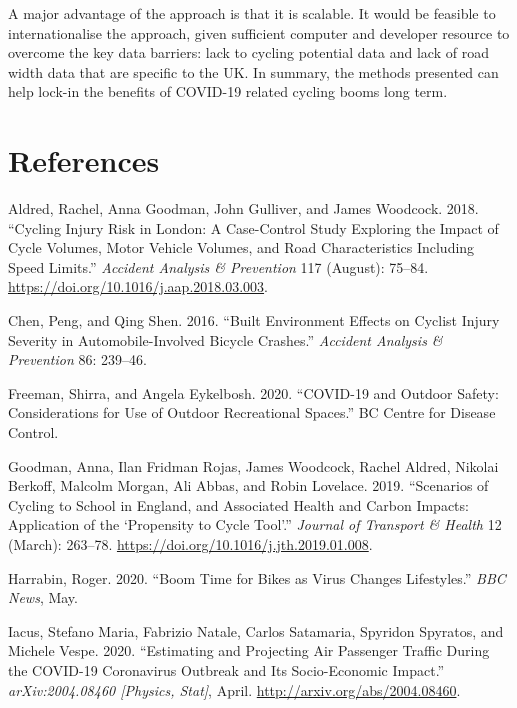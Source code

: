 \documentclass[
]{article}
\newlength{\cslhangindent}
\newenvironment{cslreferences}%
  {\setlength{\parindent}{0pt}%
  \everypar{\setlength{\hangindent}{\cslhangindent}}\ignorespaces}%
  {\par}
\begin{document}
A major advantage of the approach is that it is scalable.
It would be feasible to internationalise the approach, given sufficient computer and developer resource to overcome the key data barriers: lack to cycling potential data and lack of road width data that are specific to the UK.
In summary, the methods presented can help lock-in the benefits of COVID-19 related cycling booms long term.

\hypertarget{references}{%
\section*{References}\label{references}}

\hypertarget{refs}{}
\begin{cslreferences}
\leavevmode\hypertarget{ref-aldred_cycling_2018}{}%
Aldred, Rachel, Anna Goodman, John Gulliver, and James Woodcock. 2018. ``Cycling Injury Risk in London: A Case-Control Study Exploring the Impact of Cycle Volumes, Motor Vehicle Volumes, and Road Characteristics Including Speed Limits.'' \emph{Accident Analysis \& Prevention} 117 (August): 75--84. \url{https://doi.org/10.1016/j.aap.2018.03.003}.

\leavevmode\hypertarget{ref-chen_built_2016}{}%
Chen, Peng, and Qing Shen. 2016. ``Built Environment Effects on Cyclist Injury Severity in Automobile-Involved Bicycle Crashes.'' \emph{Accident Analysis \& Prevention} 86: 239--46.

\leavevmode\hypertarget{ref-freeman_covid19_2020}{}%
Freeman, Shirra, and Angela Eykelbosh. 2020. ``COVID-19 and Outdoor Safety: Considerations for Use of Outdoor Recreational Spaces.'' BC Centre for Disease Control.

\leavevmode\hypertarget{ref-goodman_scenarios_2019}{}%
Goodman, Anna, Ilan Fridman Rojas, James Woodcock, Rachel Aldred, Nikolai Berkoff, Malcolm Morgan, Ali Abbas, and Robin Lovelace. 2019. ``Scenarios of Cycling to School in England, and Associated Health and Carbon Impacts: Application of the `Propensity to Cycle Tool'.'' \emph{Journal of Transport \& Health} 12 (March): 263--78. \url{https://doi.org/10.1016/j.jth.2019.01.008}.

\leavevmode\hypertarget{ref-harrabin_boom_2020}{}%
Harrabin, Roger. 2020. ``Boom Time for Bikes as Virus Changes Lifestyles.'' \emph{BBC News}, May.

\leavevmode\hypertarget{ref-iacus_estimating_2020}{}%
Iacus, Stefano Maria, Fabrizio Natale, Carlos Satamaria, Spyridon Spyratos, and Michele Vespe. 2020. ``Estimating and Projecting Air Passenger Traffic During the COVID-19 Coronavirus Outbreak and Its Socio-Economic Impact.'' \emph{arXiv:2004.08460 {[}Physics, Stat{]}}, April. \url{http://arxiv.org/abs/2004.08460}.


\end{cslreferences}
\end{document}
